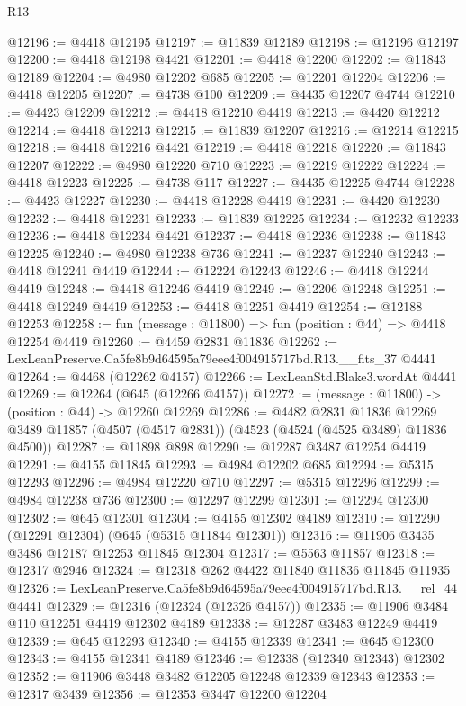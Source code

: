 \begin{lexlean}{R13}
\begin{coremodule}
@12196 := @4418 @12195
@12197 := @11839 @12189
@12198 := @12196 @12197
@12200 := @4418 @12198 @4421
@12201 := @4418 @12200
@12202 := @11843 @12189
@12204 := @4980 @12202 @685
@12205 := @12201 @12204
@12206 := @4418 @12205
@12207 := @4738 @100
@12209 := @4435 @12207 @4744
@12210 := @4423 @12209
@12212 := @4418 @12210 @4419
@12213 := @4420 @12212
@12214 := @4418 @12213
@12215 := @11839 @12207
@12216 := @12214 @12215
@12218 := @4418 @12216 @4421
@12219 := @4418 @12218
@12220 := @11843 @12207
@12222 := @4980 @12220 @710
@12223 := @12219 @12222
@12224 := @4418 @12223
@12225 := @4738 @117
@12227 := @4435 @12225 @4744
@12228 := @4423 @12227
@12230 := @4418 @12228 @4419
@12231 := @4420 @12230
@12232 := @4418 @12231
@12233 := @11839 @12225
@12234 := @12232 @12233
@12236 := @4418 @12234 @4421
@12237 := @4418 @12236
@12238 := @11843 @12225
@12240 := @4980 @12238 @736
@12241 := @12237 @12240
@12243 := @4418 @12241 @4419
@12244 := @12224 @12243
@12246 := @4418 @12244 @4419
@12248 := @4418 @12246 @4419
@12249 := @12206 @12248
@12251 := @4418 @12249 @4419
@12253 := @4418 @12251 @4419
@12254 := @12188 @12253
@12258 := fun (message : @11800) => fun (position : @44) => @4418 @12254 @4419
@12260 := @4459 @2831 @11836
@12262 := LexLeanPreserve.Ca5fe8b9d64595a79eee4f004915717bd.R13.__fits_37 @4441
@12264 := @4468 (@12262 @4157)
@12266 := LexLeanStd.Blake3.wordAt @4441
@12269 := @12264 (@645 (@12266 @4157))
@12272 := (message : @11800) -> (position : @44) -> @12260 @12269
@12286 := @4482
    @2831
    @11836
    @12269
    @3489
    @11857
    (@4507 (@4517 @2831))
    (@4523 (@4524 (@4525 @3489) @11836 @4500))
@12287 := @11898 @898
@12290 := @12287 @3487 @12254 @4419
@12291 := @4155 @11845
@12293 := @4984 @12202 @685
@12294 := @5315 @12293
@12296 := @4984 @12220 @710
@12297 := @5315 @12296
@12299 := @4984 @12238 @736
@12300 := @12297 @12299
@12301 := @12294 @12300
@12302 := @645 @12301
@12304 := @4155 @12302 @4189
@12310 := @12290 (@12291 @12304) (@645 (@5315 @11844 @12301))
@12316 := @11906 @3435 @3486 @12187 @12253 @11845 @12304
@12317 := @5563 @11857
@12318 := @12317 @2946
@12324 := @12318 @262 @4422 @11840 @11836 @11845 @11935
@12326 := LexLeanPreserve.Ca5fe8b9d64595a79eee4f004915717bd.R13.__rel_44 @4441
@12329 := @12316 (@12324 (@12326 @4157))
@12335 := @11906 @3484 @110 @12251 @4419 @12302 @4189
@12338 := @12287 @3483 @12249 @4419
@12339 := @645 @12293
@12340 := @4155 @12339
@12341 := @645 @12300
@12343 := @4155 @12341 @4189
@12346 := @12338 (@12340 @12343) @12302
@12352 := @11906 @3448 @3482 @12205 @12248 @12339 @12343
@12353 := @12317 @3439
@12356 := @12353 @3447 @12200 @12204

\end{coremodule}
\end{lexlean}
